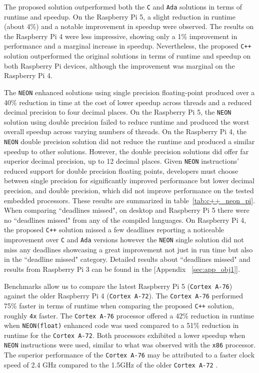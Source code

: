 
The proposed solution outperformed both the \texttt{C} and \texttt{Ada} solutions in terms of runtime and speedup. On the Raspberry Pi 5, a slight reduction in runtime (about 4\%) and a notable improvement in speedup were observed. The results on the Raspberry Pi 4 were less impressive, showing only a 1\% improvement in performance and a marginal increase in speedup. Nevertheless, the proposed \texttt{C++} solution outperformed the original solutions in terms of runtime and speedup on both Raspberry Pi devices, although the improvement was marginal on the Raspberry Pi 4.

The \texttt{NEON} enhanced solutions using single precision floating-point produced over a 40\% reduction in time at the cost of lower speedup across threads and a reduced decimal precision to four decimal places. On the Raspberry Pi 5, the \texttt{NEON} solution using double precision failed to reduce runtime and produced the worst overall speedup across varying numbers of threads. On the Raspberry Pi 4, the \texttt{NEON} double precision solution did not reduce the runtime and produced a similar speedup to other solutions. However, the double precision solutions did offer far superior decimal precision, up to 12 decimal places. Given \texttt{NEON} instructions' reduced support for double precision floating points, developers must choose between single precision for significantly improved performance but lower decimal precision, and double precision, which did not improve performance on the tested embedded processors. These results are summarized in table~\ref{tab:c++_neon_pi}. When comparing ``deadlines missed", on desktop and Raspberry Pi 5 there were no ``deadlines missed" from any of the compiled languages. On Raspberry Pi 4, the proposed \texttt{C++} solution missed a few deadlines reporting a noticeable improvement over \texttt{C} and \texttt{Ada} versions however the \texttt{NEON} single solution did not miss any deadlines showcasing a great improvement not just in run time but also in the ``deadline missed" category. Detailed results about ``deadlines missed" and results from Raspberry Pi 3 can be found in the [Appendix ~\ref{sec:app_obj1}].

Benchmarks allow us to compare the latest Raspberry Pi 5 (\texttt{Cortex A-76}) against the older Raspberry Pi 4 (\texttt{Cortex A-72}). The \texttt{Cortex A-76} performed 75\% faster in terms of runtime when comparing the proposed \texttt{C++} solution, roughly \texttt{4x} faster. The \texttt{Cortex A-76} processor offered a 42\% reduction in runtime when \texttt{NEON(float)} enhanced code was used compared to a 51\% reduction in runtime for the \texttt{Cortex A-72}. Both processors exhibited a lower speedup when \texttt{NEON} instructions were used, similar to what was observed with the \texttt{x86} processor. The superior performance of the \texttt{Cortex A-76} may be attributed to a faster clock speed of 2.4 GHz compared to the 1.5GHz of the older \texttt{Cortex A-72} \cite{rasp_pi5_pi4_comparision}.

